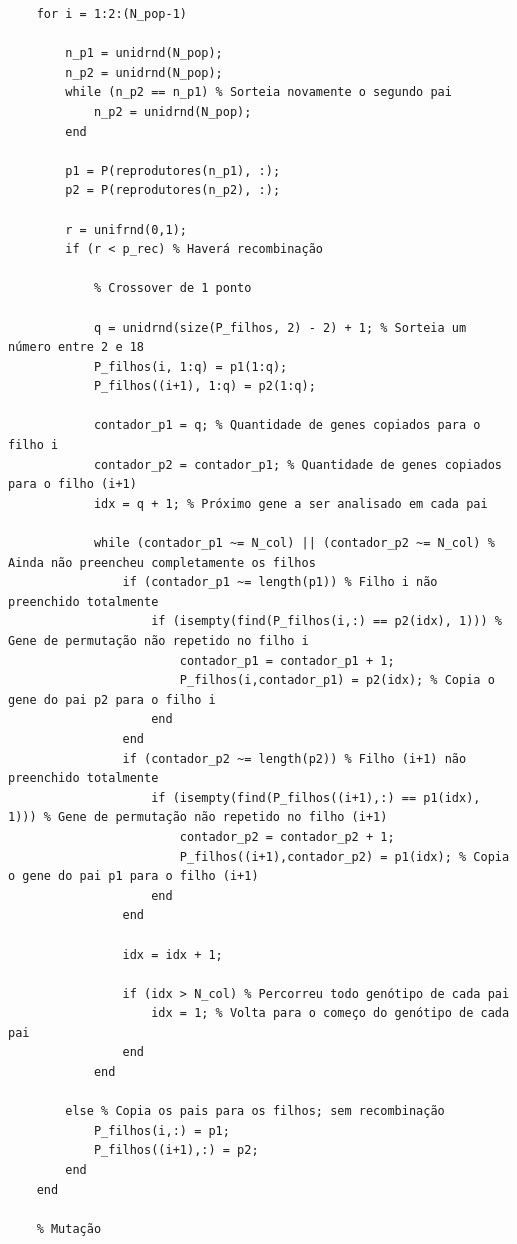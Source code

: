 \documentclass{report}
\begin{document}
\begin{lstlisting}
    for i = 1:2:(N_pop-1)

        n_p1 = unidrnd(N_pop);
        n_p2 = unidrnd(N_pop);
        while (n_p2 == n_p1) % Sorteia novamente o segundo pai
            n_p2 = unidrnd(N_pop);
        end

        p1 = P(reprodutores(n_p1), :);
        p2 = P(reprodutores(n_p2), :);

        r = unifrnd(0,1);
        if (r < p_rec) % Haverá recombinação

            % Crossover de 1 ponto            

            q = unidrnd(size(P_filhos, 2) - 2) + 1; % Sorteia um número entre 2 e 18
            P_filhos(i, 1:q) = p1(1:q);
            P_filhos((i+1), 1:q) = p2(1:q);

            contador_p1 = q; % Quantidade de genes copiados para o filho i
            contador_p2 = contador_p1; % Quantidade de genes copiados para o filho (i+1)
            idx = q + 1; % Próximo gene a ser analisado em cada pai

            while (contador_p1 ~= N_col) || (contador_p2 ~= N_col) % Ainda não preencheu completamente os filhos
                if (contador_p1 ~= length(p1)) % Filho i não preenchido totalmente
                    if (isempty(find(P_filhos(i,:) == p2(idx), 1))) % Gene de permutação não repetido no filho i
                        contador_p1 = contador_p1 + 1;
                        P_filhos(i,contador_p1) = p2(idx); % Copia o gene do pai p2 para o filho i
                    end
                end
                if (contador_p2 ~= length(p2)) % Filho (i+1) não preenchido totalmente
                    if (isempty(find(P_filhos((i+1),:) == p1(idx), 1))) % Gene de permutação não repetido no filho (i+1)
                        contador_p2 = contador_p2 + 1;
                        P_filhos((i+1),contador_p2) = p1(idx); % Copia o gene do pai p1 para o filho (i+1)
                    end
                end

                idx = idx + 1;
                
                if (idx > N_col) % Percorreu todo genótipo de cada pai
                    idx = 1; % Volta para o começo do genótipo de cada pai
                end
            end
            
        else % Copia os pais para os filhos; sem recombinação
            P_filhos(i,:) = p1;
            P_filhos((i+1),:) = p2;
        end
    end
    
    % Mutação
    

\end{lstlisting}
\end{document}
